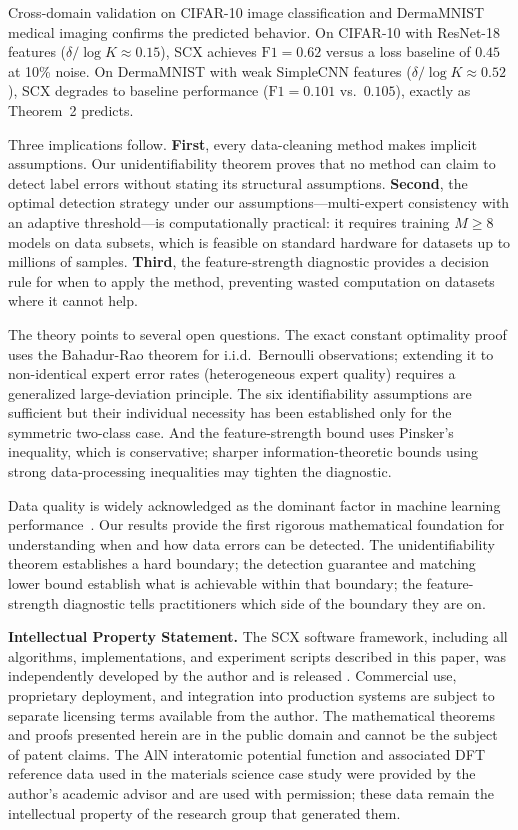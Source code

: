 \documentclass[12pt,a4paper]{article}
\begin{document}
Cross-domain validation on CIFAR-10 image classification and DermaMNIST medical imaging confirms the predicted behavior. On CIFAR-10 with ResNet-18 features ($\delta / \log K \approx 0.15$), SCX achieves $\mathrm{F1}=0.62$ versus a loss baseline of $0.45$ at 10\% noise. On DermaMNIST with weak SimpleCNN features ($\delta / \log K \approx 0.52$), SCX degrades to baseline performance ($\mathrm{F1}=0.101$ vs.\ $0.105$), exactly as Theorem~2 predicts.

Three implications follow. \textbf{First}, every data-cleaning method makes implicit assumptions. Our unidentifiability theorem proves that no method can claim to detect label errors without stating its structural assumptions. \textbf{Second}, the optimal detection strategy under our assumptions---multi-expert consistency with an adaptive threshold---is computationally practical: it requires training $M \geq 8$ models on data subsets, which is feasible on standard hardware for datasets up to millions of samples. \textbf{Third}, the feature-strength diagnostic provides a decision rule for when to apply the method, preventing wasted computation on datasets where it cannot help.

The theory points to several open questions. The exact constant optimality proof uses the Bahadur-Rao theorem for i.i.d.\ Bernoulli observations; extending it to non-identical expert error rates (heterogeneous expert quality) requires a generalized large-deviation principle. The six identifiability assumptions are sufficient but their individual necessity has been established only for the symmetric two-class case. And the feature-strength bound uses Pinsker's inequality, which is conservative; sharper information-theoretic bounds using strong data-processing inequalities may tighten the diagnostic.

Data quality is widely acknowledged as the dominant factor in machine learning performance~\cite{placeholder}. Our results provide the first rigorous mathematical foundation for understanding when and how data errors can be detected. The unidentifiability theorem establishes a hard boundary; the detection guarantee and matching lower bound establish what is achievable within that boundary; the feature-strength diagnostic tells practitioners which side of the boundary they are on.

\begin{flushleft}
\end{flushleft}

\textbf{Intellectual Property Statement.}
The SCX software framework, including all algorithms, implementations, and experiment scripts described in this paper, was independently developed by the author and is released . Commercial use, proprietary deployment, and integration into production systems are subject to separate licensing terms available from the author. The mathematical theorems and proofs presented herein are in the public domain and cannot be the subject of patent claims. The AlN interatomic potential function and associated DFT reference data used in the materials science case study were provided by the author's academic advisor and are used with permission; these data remain the intellectual property of the research group that generated them.
\end{document}
